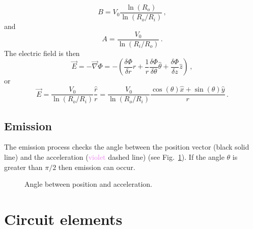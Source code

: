 \documentclass[a4paper,10pt]{article}
\numberwithin{equation}{section}
\begin{document}
\begin{equation}
  B = V_0\frac{\ln(R_o)}{\ln(R_o/R_i)}\, ,
\end{equation}
and
\begin{equation}
  A = \frac{V_0}{\ln(R_i/R_o)}\, .
\end{equation}
The electric field is then
\begin{equation}
 \vec{E} = - \vec{\nabla}\Phi
 = -\left(\frac{\delta \Phi}{\delta r}\hat{r} + \frac{1}{r}\frac{\delta\Phi}{\delta \theta}\hat{\theta} + \frac{\delta\Phi}{\delta z}\hat{z} \right)\, ,
\end{equation}
or
\begin{equation}
 \vec{E} = \frac{V_0}{\ln(R_o/R_i)}\frac{\hat{r}}{r}
         = \frac{V_0}{\ln(R_o/R_i)} \frac{\cos(\theta)\hat{x} + \sin(\theta)\hat{y}}{r}\, .
\end{equation}

\subsection{Emission}
The emission process checks the angle between the position vector (black solid line) and the acceleration (\textcolor{violet}{violet} dashed line) (see Fig.~\ref{fig:angle}). If the angle \(\theta\) is greater than \(\pi/2\) then emission can occur.
\begin{figure}[!h]
  \centering
  \caption{Angle between position and acceleration.}
  \label{fig:angle}
\end{figure}

\cleardoublepage
\section{Circuit elements}
\end{document}
